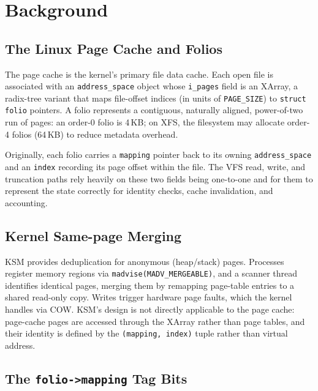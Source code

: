 \documentclass[conference]{IEEEtran}
\begin{document}
\section{Background}

\subsection{The Linux Page Cache and Folios}

The page cache is the kernel's primary file data cache. Each open file is associated with an \texttt{address\_space} object whose \texttt{i\_pages} field is an XArray, a radix-tree variant that maps file-offset indices (in units of \texttt{PAGE\_SIZE}) to \texttt{struct folio} pointers. A folio represents a contiguous, naturally aligned, power-of-two run of pages: an order-0 folio is 4\,KB; on XFS, the filesystem may allocate order-4 folios (64\,KB) to reduce metadata overhead.

Originally, each folio carries a \texttt{mapping} pointer back to its owning \texttt{address\_space} and an \texttt{index} recording its page offset within the file. The VFS read, write, and truncation paths rely heavily on these two fields being one-to-one and for them to represent the state correctly for identity checks, cache invalidation, and accounting.

\subsection{Kernel Same-page Merging}

KSM \cite{b1} provides deduplication for anonymous (heap/stack) pages. Processes register memory regions via \texttt{madvise(MADV\_MERGEABLE)}, and a scanner thread identifies identical pages, merging them by remapping page-table entries to a shared read-only copy. Writes trigger hardware page faults, which the kernel handles via COW. KSM's design is not directly applicable to the page cache: page-cache pages are accessed through the XArray rather than page tables, and their identity is defined by the \texttt{(mapping, index)} tuple rather than virtual address.

\subsection{The \texttt{folio->mapping} Tag Bits}
\end{document}
